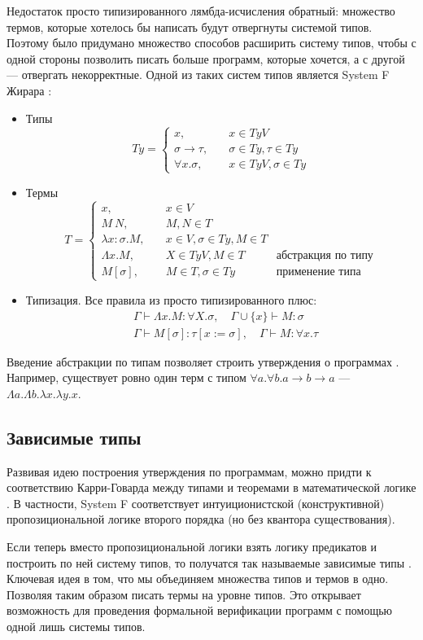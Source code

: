 Недостаток просто типизированного лямбда-исчисления обратный: множество термов,
которые хотелось бы написать будут отвергнуты системой типов. Поэтому было придумано
множество способов расширить систему типов, чтобы с одной стороны позволить писать
больше программ, которые хочется, а с другой --- отвергать некорректные. Одной из
таких систем типов является System F Жирара \cite{tapl}:
\begin{itemize}
\item Типы
   \[
   Ty = \left\{
   \begin{array}{lr}
   x,\quad& x \in TyV\\
   \sigma \rightarrow \tau,\quad& \sigma \in Ty, \tau \in Ty\\
   \forall x. \sigma,\quad& x \in TyV, \sigma \in Ty
   \end{array}
   \right.
   \]
\item Термы
   \[
   T = \left\{
   \begin{array}{lrr}
   x,\quad& x \in V&\\
   M\ N,\quad& M, N \in T&\\
   \lambda x : \sigma. M,\quad& x \in V, \sigma \in Ty, M \in T&\\
   \Lambda x. M,\quad& X \in TyV, M \in T\quad&\text{абстракция по типу}\\
   M [\sigma],\quad& M \in T, \sigma \in Ty\quad&\text{применение типа}
   \end{array}
   \right.
   \]
\item Типизация. Все правила из просто типизированного плюс:
   \begin{align*}
   & \Gamma \vdash \Lambda x. M: \forall X. \sigma,\quad \Gamma \cup \{x\} \vdash M : \sigma\\
   & \Gamma \vdash M [\sigma] : \tau[x := \sigma],\quad \Gamma \vdash M : \forall x. \tau
   \end{align*}
\end{itemize}

Введение абстракции по типам позволяет строить утверждения о программах \cite{theorems-for-free}.
Например, существует ровно один терм с типом \(\forall a. \forall b. a \rightarrow b \rightarrow a\) ---
\(\Lambda a. \Lambda b. \lambda x. \lambda y. x\).

\subsection{Зависимые типы}

Развивая идею построения утверждения по программам, можно придти к соответствию Карри-Говарда
между типами и теоремами в математической логике \cite{propositions-as-types}. В частности, System F
соответствует интуиционистской (конструктивной) пропозициональной логике второго порядка
(но без квантора существования).

Если теперь вместо пропозициональной логики взять логику предикатов и построить по ней систему типов,
то получатся так называемые зависимые типы \cite{intuitionistic-theory-of-types}.
Ключевая идея в том, что мы объединяем множества типов и термов в одно. Позволяя таким образом писать
термы на уровне типов. Это открывает возможность для проведения формальной верификации программ с
помощью одной лишь системы типов.
